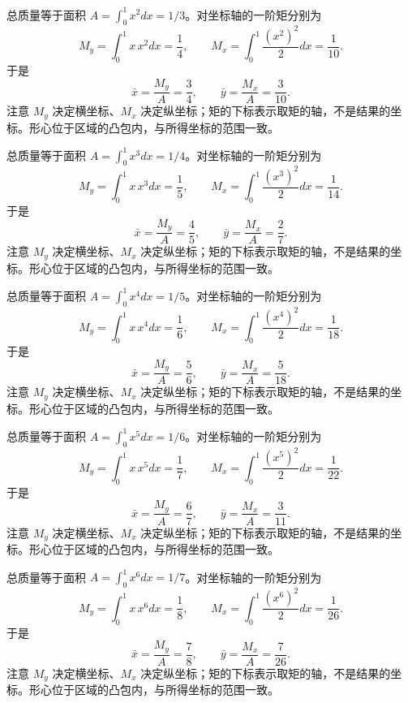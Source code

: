\documentclass[UTF8,12pt,a4paper,fontset=fandol]{ctexart}
\begin{document}
\begin{solve}\label{ans:c21q14}
总质量等于面积 $A=\int_0^1x^{2}dx=1/3$。对坐标轴的一阶矩分别为
\[
M_y=\int_0^1x\,x^{2}dx=\frac1{4},\qquad M_x=\int_0^1\frac{(x^{2})^2}2dx=\frac1{10}.
\]
于是
\[
\bar x=\frac{M_y}A=\frac{3}{4},\qquad\bar y=\frac{M_x}A=\frac{3}{10}.
\]
注意 $M_y$ 决定横坐标、$M_x$ 决定纵坐标；矩的下标表示取矩的轴，不是结果的坐标。形心位于区域的凸包内，与所得坐标的范围一致。
\end{solve}

\begin{solve}\label{ans:c21q15}
总质量等于面积 $A=\int_0^1x^{3}dx=1/4$。对坐标轴的一阶矩分别为
\[
M_y=\int_0^1x\,x^{3}dx=\frac1{5},\qquad M_x=\int_0^1\frac{(x^{3})^2}2dx=\frac1{14}.
\]
于是
\[
\bar x=\frac{M_y}A=\frac{4}{5},\qquad\bar y=\frac{M_x}A=\frac{2}{7}.
\]
注意 $M_y$ 决定横坐标、$M_x$ 决定纵坐标；矩的下标表示取矩的轴，不是结果的坐标。形心位于区域的凸包内，与所得坐标的范围一致。
\end{solve}

\begin{solve}\label{ans:c21q16}
总质量等于面积 $A=\int_0^1x^{4}dx=1/5$。对坐标轴的一阶矩分别为
\[
M_y=\int_0^1x\,x^{4}dx=\frac1{6},\qquad M_x=\int_0^1\frac{(x^{4})^2}2dx=\frac1{18}.
\]
于是
\[
\bar x=\frac{M_y}A=\frac{5}{6},\qquad\bar y=\frac{M_x}A=\frac{5}{18}.
\]
注意 $M_y$ 决定横坐标、$M_x$ 决定纵坐标；矩的下标表示取矩的轴，不是结果的坐标。形心位于区域的凸包内，与所得坐标的范围一致。
\end{solve}

\begin{solve}\label{ans:c21q17}
总质量等于面积 $A=\int_0^1x^{5}dx=1/6$。对坐标轴的一阶矩分别为
\[
M_y=\int_0^1x\,x^{5}dx=\frac1{7},\qquad M_x=\int_0^1\frac{(x^{5})^2}2dx=\frac1{22}.
\]
于是
\[
\bar x=\frac{M_y}A=\frac{6}{7},\qquad\bar y=\frac{M_x}A=\frac{3}{11}.
\]
注意 $M_y$ 决定横坐标、$M_x$ 决定纵坐标；矩的下标表示取矩的轴，不是结果的坐标。形心位于区域的凸包内，与所得坐标的范围一致。
\end{solve}

\begin{solve}\label{ans:c21q18}
总质量等于面积 $A=\int_0^1x^{6}dx=1/7$。对坐标轴的一阶矩分别为
\[
M_y=\int_0^1x\,x^{6}dx=\frac1{8},\qquad M_x=\int_0^1\frac{(x^{6})^2}2dx=\frac1{26}.
\]
于是
\[
\bar x=\frac{M_y}A=\frac{7}{8},\qquad\bar y=\frac{M_x}A=\frac{7}{26}.
\]
注意 $M_y$ 决定横坐标、$M_x$ 决定纵坐标；矩的下标表示取矩的轴，不是结果的坐标。形心位于区域的凸包内，与所得坐标的范围一致。
\end{solve}
\end{document}
